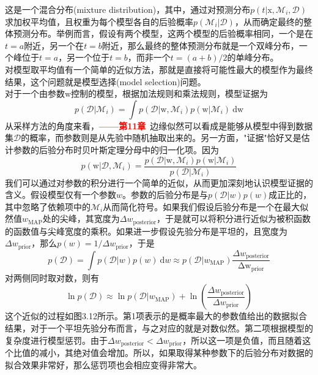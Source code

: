 \documentclass[b5paper]{book}
\numberwithin{equation}{chapter}
\newcommand {\bx} {\boldsymbol{\mathrm{x}}}
\newcommand {\bw} {\boldsymbol{\mathrm{w}}}
\newcommand {\calD} {\mathcal{D}}
\begin{document}
{\begin{equation}
	\end{equation}
	这是一个混合分布(mixture distribution)，其中，通过对预测分布$p(t|\bx,\mathcal{M}_i, \calD)$求加权平均值，且权重为每个模型各自的后验概率$p(\mathcal{M}_i|\calD)$，从而确定最终的整体预测分布。举例而言，假设有两个模型，这两个模型的后验概率相同，一个是在$t=a$附近，另一个在$t=b$附近，那么最终的整体预测分布就是一个双峰分布，一个峰位于$t=a$，另一个位于$t=b$，而非一个$t=(a+b)/2$的单峰分布。\\
	\indent 对模型取平均值有一个简单的近似方法，那就是直接将可能性最大的模型作为最终结果，这个问题就是模型选择(model selection)问题。\\
	\indent 对于一个由参数$\bw$控制的模型，根据加法规则和乘法规则，模型证据为
	\begin{equation}
		p(\calD|\mathcal{M}_i)=\int p(\calD|\bw, \mathcal{M}_i)p(\bw|\mathcal{M}_i)\ \mathrm{d}\bw
	\end{equation}
	从采样方法的角度来看，\textcolor{red}{\textbf{——第11章}}\ 边缘似然可以看成是能够从模型中得到数据集$\calD$的概率，而参数则是从先验中随机抽取出来的。另一方面，"证据"恰好又是估计参数的后验分布时贝叶斯定理分母中的归一化项。因为
	\begin{equation}
		p(\bw|\calD,\mathcal{M}_i) = \frac{p(\calD|\bw,\mathcal{M}_i) p(\bw|\mathcal{M}_i)}{p(\calD|\mathcal{M}_i)}
	\end{equation}
	\indent 我们可以通过对参数的积分进行一个简单的近似，从而更加深刻地认识模型证据的含义。假设模型仅有一个参数$w$。参数的后验分布是与$p(\calD|w)p(w)$成正比的，其中忽略了依赖项中的$\mathcal{M}_i$从而简化符号。如果我们假设后验分布是一个在最大似然值$w_{\mathrm{MAP}}$处的尖峰，其宽度为$\Delta w_{\mathrm{posterior}}$，于是就可以将积分进行近似为被积函数的函数值与尖峰宽度的乘积。如果进一步假设先验分布是平坦的，且宽度为$\Delta w_{\mathrm{prior}}$，那么$p(w)=1/\Delta w_{\mathrm{prior}}$，于是
	\begin{equation}
		p(\mathcal{D})= \int p(\calD|w)p(w)\ \mathrm{d}w \approx p(\calD|w_{\mathrm{MAP}})\frac{\Delta w_{\mathrm{posterior}}}{\mathrm{\Delta w_{\mathrm{prior}}}}
	\end{equation}
	对两侧同时取对数，则有
	\begin{equation}
		\ln p(\calD) \approx \ln p(\calD|w_{\mathrm{MAP}})+\ln \left(\frac{\Delta w_{\mathrm{posterior}}}{\Delta w_{\mathrm{prior}}}\right)
	\end{equation}
	这个近似的过程如图3.12所示。第1项表示的是概率最大的参数值给出的数据拟合结果，对于一个平坦先验分布而言，与之对应的就是对数似然。第二项根据模型的复杂度进行模型惩罚。由于$\Delta w_{\mathrm{posterior}} < \Delta w_{\mathrm{prior}}$，所以这一项是负值，而且随着这个比值的减小，其绝对值会增加。所以，如果取得某种参数下的后验分布对数据的拟合效果非常好，那么惩罚项也会相应变得非常大。
}
\end{document}
